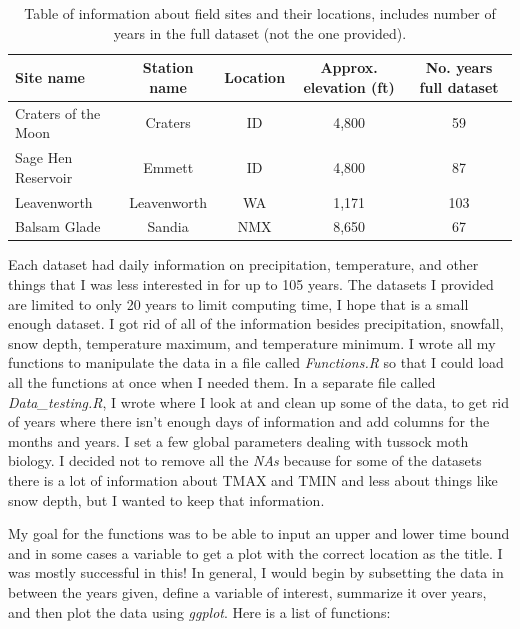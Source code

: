 \documentclass[12pt,letter]{article}
\begin{document}
\begin{table}[h!]
\centering
\begin{tabular}{l c c c c} 
 \hline
 Site name & Station name & Location & Approx. elevation (ft) & No. years full dataset \\
 \hline
Craters of the Moon & Craters & ID & 4,800 & 59 \\
Sage Hen Reservoir & Emmett & ID & 4,800 & 87 \\
Leavenworth & Leavenworth & WA & 1,171 & 103 \\
Balsam Glade & Sandia & NMX & 8,650 & 67 \\
 \hline
\end{tabular}
\caption{Table of information about field sites and their locations, includes number of years in the full dataset (not the one provided). }
\label{table:1}
\end{table}

Each dataset had daily information on precipitation, temperature, and other things that I was less interested in for up to 105 years. The datasets I provided are limited to only 20 years to limit computing time, I hope that is a small enough dataset. I got rid of all of the information besides precipitation, snowfall, snow depth, temperature maximum, and temperature minimum. I wrote all my functions to manipulate the data in a file called \textit{Functions.R} so that I could load all the functions at once when I needed them. In a separate file called \textit{Data\_testing.R}, I wrote where I look at and clean up some of the data, to get rid of years where there isn't enough days of information and add columns for the months and years. I set a few global parameters dealing with tussock moth biology. I decided not to remove all the \textit{NAs} because for some of the datasets there is a lot of information about TMAX and TMIN and less about things like snow depth, but I wanted to keep that information.

My goal for the functions was to be able to input an upper and lower time bound and in some cases a variable to get a plot with the correct location as the title. I was mostly successful in this! In general, I would begin by subsetting the data in between the years given, define a variable of interest, summarize it over years, and then plot the data using \textit{ggplot}. Here is a list of functions:
\end{document}
